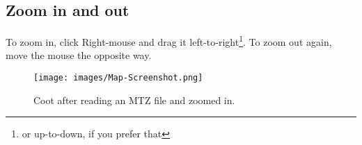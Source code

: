 \documentclass{article}
\begin{document}
\subsection{Zoom in and out}
To zoom in, click Right-mouse and drag it left-to-right\footnote{or
  up-to-down, if you prefer that}. To zoom out again, move the mouse
the opposite way.

\begin{figure}[htbp]
  \begin{center}
    \leavevmode
    \texttt{[image: images/Map-Screenshot.png]}
    \caption{Coot after reading an MTZ file and zoomed in.}
    \label{fig:map_screenshot}
  \end{center}
\end{figure}
\end{document}
